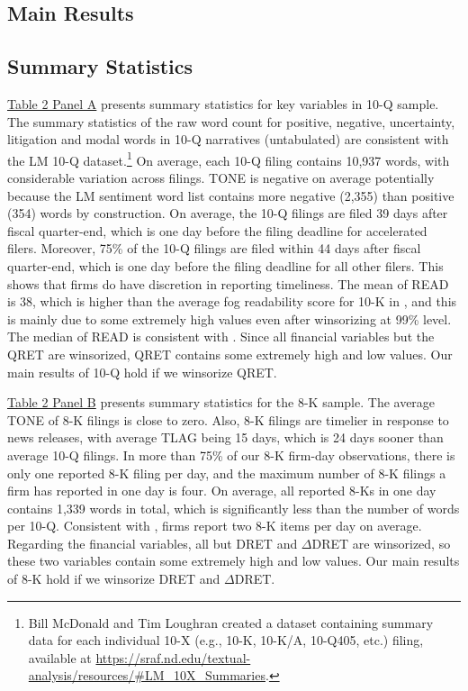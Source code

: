 \documentclass[letterpaper,12pt]{article}
\begin{document}
\begin{spacing}{1.5}
\section{Main Results}
\subsection{Summary Statistics}
\noindent \hyperref[T2PA]{Table 2 Panel A} presents summary statistics for key variables in 10-Q sample. The summary statistics of the raw word count for positive, negative, uncertainty, litigation and modal words in 10-Q narratives (untabulated) are consistent with the LM 10-Q dataset.\footnote{Bill McDonald and Tim Loughran created a dataset containing summary data for each individual 10-X (e.g., 10-K, 10-K/A, 10-Q405, etc.) filing, available at \url{https://sraf.nd.edu/textual-analysis/resources/\#LM_10X_Summaries}.} On average, each 10-Q filing contains 10,937 words, with considerable variation across filings. TONE is negative on average potentially because the LM sentiment word list contains more negative (2,355) than positive (354) words by construction. On average, the 10-Q filings are filed 39 days after fiscal quarter-end, which is one day before the filing deadline for accelerated filers. Moreover, 75\% of the 10-Q filings are filed within 44 days after fiscal quarter-end, which is one day before the filing deadline for all other filers. This shows that firms do have discretion in reporting timeliness. The mean of READ is 38, which is higher than the average fog readability score for 10-K in , and this is mainly due to some extremely high values even after winsorizing at 99\% level. The median of READ is consistent with . Since all financial variables but the QRET are winsorized, QRET contains some extremely high and low values. Our main results of 10-Q hold if we winsorize QRET.

\hyperref[T2PB]{Table 2 Panel B} presents summary statistics for the 8-K sample. The average TONE of 8-K filings is close to zero. Also, 8-K filings are timelier in response to news releases, with average TLAG being 15 days, which is 24 days sooner than average 10-Q filings. In more than 75\% of our 8-K firm-day observations, there is only one reported 8-K filing per day, and the maximum number of 8-K filings a firm has reported in one day is four. On average, all reported 8-Ks in one day contains 1,339 words in total, which is significantly less than the number of words per 10-Q. Consistent with , firms report two 8-K items per day on average. Regarding the financial variables, all but DRET and $\Delta$DRET are winsorized, so these two variables contain some extremely high and low values. Our main results of 8-K hold if we winsorize DRET and $\Delta$DRET.


\end{spacing}
\end{document}
